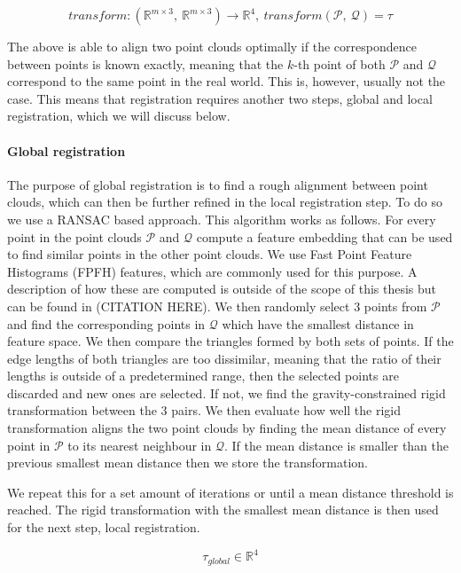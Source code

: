 \begin{equation}
    transform: (\mathbb{R}^{m \times 3},\ \mathbb{R}^{m \times 3}) \rightarrow \mathbb{R}^4,\ transform(\mathcal{P},\ \mathcal{Q}) = \tau
\end{equation}

The above is able to align two point clouds optimally if the correspondence between points is known exactly, meaning that the \(k\)-th point of both \(\mathcal{P}\) and \(\mathcal{Q}\) correspond to the same point in the real world. This is, however, usually not the case. This means that registration requires another two steps, global and local registration, which we will discuss below.

\paragraph{Global registration}
The purpose of global registration is to find a rough alignment between point clouds, which can then be further refined in the local registration step. To do so we use a RANSAC based approach. This algorithm works as follows. For every point in the point clouds \(\mathcal{P}\) and \(\mathcal{Q}\) compute a feature embedding that can be used to find similar points in the other point clouds. We use Fast Point Feature Histograms (FPFH) features, which are commonly used for this purpose. A description of how these are computed is outside of the scope of this thesis but can be found in (CITATION HERE). We then randomly select 3 points from \(\mathcal{P}\) and find the corresponding points in \(\mathcal{Q}\) which have the smallest distance in feature space. We then compare the triangles formed by both sets of points. If the edge lengths of both triangles are too dissimilar, meaning that the ratio of their lengths is outside of a predetermined range, then the selected points are discarded and new ones are selected. If not, we find the gravity-constrained rigid transformation between the 3 pairs. We then evaluate how well the rigid transformation aligns the two point clouds by finding the mean distance of every point in \(\mathcal{P}\) to its nearest neighbour in \(\mathcal{Q}\). If the mean distance is smaller than the previous smallest mean distance then we store the transformation.

We repeat this for a set amount of iterations or until a mean distance threshold is reached. The rigid transformation with the smallest mean distance is then used for the next step, local registration.

\begin{equation}
    \tau_{global} \in \mathbb{R}^4
\end{equation}

